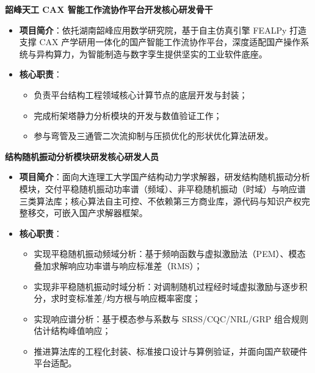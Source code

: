 \documentclass[11pt]{article}
\begin{document}
\begin{minipage}[t]{\textwidth}
		\vspace{0.6em}
		
		{\large \textbf{韶峰天工 CAX 智能工作流协作平台开发}}\quad \textbf{核心研发骨干}
		\begin{itemize}
			\setlength{\itemsep}{0.2em}
			\item \textbf{项目简介}：依托湖南韶峰应用数学研究院，基于自主仿真引擎 FEALPy 打造支撑 CAX 产学研用一体化的国产智能工作流协作平台，深度适配国产操作系统与异构算力，为智能制造与数字孪生提供坚实的工业软件底座。
			\item \textbf{核心职责}：
			\begin{itemize}
				\setlength{\itemsep}{0.2em}
				\item 负责平台结构工程领域核心计算节点的底层开发与封装；
				\item 完成桁架塔静力分析模块的开发与数值验证工作；
				\item 参与弯管及三通管二次流抑制与压损优化的形状优化算法研发。
			\end{itemize}
		\end{itemize}

		\vspace{0.6em}

		{\large \textbf{结构随机振动分析模块研发}}\quad \textbf{核心研发人员}
		\begin{itemize}
			\setlength{\itemsep}{0.2em}
			\item \textbf{项目简介}：面向大连理工大学国产结构动力学求解器，研发结构随机振动分析模块，交付平稳随机振动功率谱（频域）、非平稳随机振动（时域）与响应谱三类算法库；核心算法自主可控、不依赖第三方商业库，源代码与知识产权完整移交，可嵌入国产求解器框架。
			\item \textbf{核心职责}：
			\begin{itemize}
				\setlength{\itemsep}{0.2em}
				\item 实现平稳随机振动频域分析：基于频响函数与虚拟激励法（PEM）、模态叠加求解响应功率谱与响应标准差（RMS）；
				\item 实现非平稳随机振动时域分析：对调制随机过程经时域虚拟激励与逐步积分，求时变标准差/均方根与响应概率密度；
				\item 实现响应谱分析：基于模态参与系数与 SRSS/CQC/NRL/GRP 组合规则估计结构峰值响应；
				\item 推进算法库的工程化封装、标准接口设计与算例验证，并面向国产软硬件平台适配。
			\end{itemize}
		\end{itemize}

		\vspace{1.2em}
	\end{minipage}
	
\end{document}
